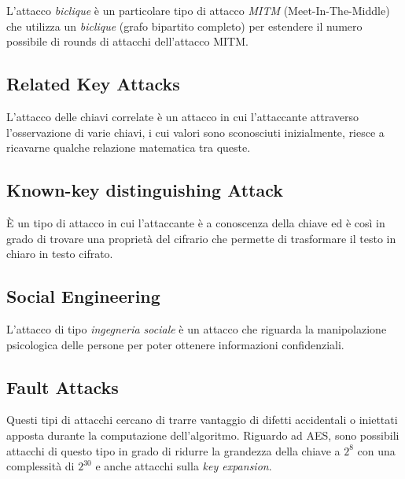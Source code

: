      

\textsf{\small L'attacco \emph{biclique} è un particolare tipo di attacco \emph{MITM} (Meet-In-The-Middle) che utilizza un \emph{biclique} (grafo bipartito completo) per estendere il numero possibile di rounds di attacchi dell'attacco MITM.}

\subsection{Related Key Attacks}

  

\textsf{\small L'attacco delle chiavi correlate è un attacco in cui l'attaccante attraverso l'osservazione di varie chiavi, i cui valori sono sconosciuti inizialmente, riesce a ricavarne qualche relazione matematica tra queste.} %

\subsection{Known-key distinguishing Attack}

  

\textsf{\small È un tipo di attacco in cui l'attaccante è a conoscenza della chiave ed è così in grado di trovare una proprietà del cifrario che permette di trasformare il testo in chiaro in testo cifrato.}

\subsection{Social Engineering}

 

\textsf{\small L'attacco di tipo \emph{ingegneria sociale} è un attacco che riguarda la manipolazione psicologica delle persone per poter ottenere informazioni confidenziali.}

\subsection{Fault Attacks}

   

\textsf{\small Questi tipi di attacchi cercano di trarre vantaggio di difetti accidentali o iniettati apposta durante la computazione dell'algoritmo. Riguardo ad AES, sono possibili attacchi di questo tipo in grado di ridurre la grandezza della chiave a $2^8$ con una complessità di $2^{30}$ e anche attacchi sulla \emph{key expansion}.}

